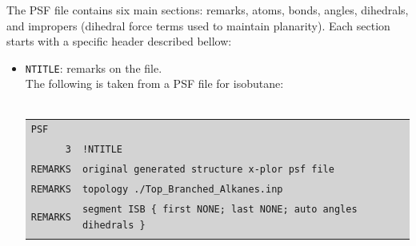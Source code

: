 The PSF file contains six main sections: remarks, atoms, bonds, angles, dihedrals, and impropers (dihedral force terms used to maintain planarity). Each section starts with a specific header described bellow: \\

\begin{itemize}
\item \texttt{NTITLE}: remarks on the file.\\
The following is taken from a PSF file for isobutane: \\\\
\colorbox{lightgray}{
\begin{tabular}{r l l l l l l l l}
\multicolumn{9}{l}{\texttt{PSF}}\\
\texttt{3} & \multicolumn{8}{l}{\texttt{!NTITLE}} \\
\texttt{REMARKS} & \multicolumn{8}{l}{\texttt{original generated structure x-plor psf file}}\\
\texttt{REMARKS} & \multicolumn{8}{l}{\texttt{topology ./Top\_Branched\_Alkanes.inp}}\\
\texttt{REMARKS} & \multicolumn{8}{l}{\texttt{segment ISB \{ first NONE; last NONE; auto angles dihedrals \}}}\\\\
\end{tabular}
}\\


\end{itemize}
